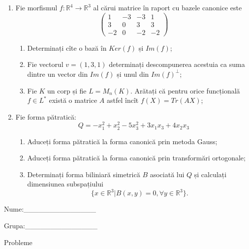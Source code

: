 \documentclass{article}
\begin{document}
\begin{enumerate}
 \item Fie morfismul $f:\mathbb{R}^4 \to \mathbb{R}^3$ al cărui matrice în raport cu bazele canonice este
$$\begin{pmatrix}
1&-3&-3&1\\
3&0&3&3\\
-2&0&-2&-2
\end{pmatrix}$$

\begin{enumerate}
\item Determinați cîte o bază în $Ker(f)$ și $Im(f)$;
\item Fie vectorul $v=(1,3,1)$ determinați descompunerea acestuia ca suma dintre un vector din $Im(f)$ și unul din $Im(f)^\perp$;
\item Fie $K$ un corp și fie $L=M_n(K)$. Arătați că pentru orice funcțională $f \in L^*$ există o matrice $A$ astfel încît $f(X)=Tr(AX)$;
\end{enumerate}
\item Fie forma pătratică:
$$Q= -x_1^2+x_2^2-5x_3^2+3x_1x_3+4x_2x_3$$

\begin{enumerate}
\item Aduceți forma pătratică la forma canonică prin metoda Gauss;
\item Aduceți forma pătratică la forma canonică prin transformări ortogonale;
\item Determinați forma biliniară simetrică $B$ asociată lui $Q$ și calculați dimensiunea subspațiului
$$\{x \in \mathbb{R}^3 | B(x,y)=0,\forall y \in \mathbb{R}^3\}.$$

\end{enumerate}
\end{enumerate}
\newpage
\begin{flushright}
Nume:\_\_\_\_\_\_\_\_\_\_\_\_\_\_
 
 
Grupa:\_\_\_\_\_\_\_\_\_\_\_\_\_\_
\end{flushright}
\begin{center}
\vspace{2cm}
{\Large Probleme}
\vspace{2cm}
\end{center}
\end{document}
